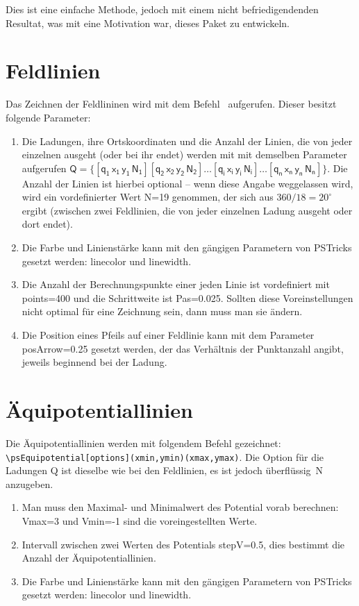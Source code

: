 \documentclass[11pt,english,ngerman,BCOR10mm,DIV12,bibliography=totoc,parskip=false,smallheadings
    headexclude,footexclude,oneside]{pst-doc}
\begin{document}
Dies ist eine einfache Methode, jedoch mit einem nicht befriedigendenden Resultat, was mit eine 
Motivation war, dieses Paket zu entwickeln.


\section{Feldlinien}
Das Zeichnen der Feldlininen wird mit dem Befehl \OptArgs\ aufgerufen.  
Dieser besitzt folgende Parameter:
\begin{enumerate}
  \item Die Ladungen, ihre Ortskoordinaten und die Anzahl der Linien, die von jeder einzelnen 
  ausgeht (oder bei ihr endet) werden mit mit demselben Parameter aufgerufen 
  $\mathsf{Q=\{[q_1\, x_1\, y_1\, N_1] [q_2\, x_2\, y_2\, N_2]\ldots[q_i\, x_i\, y_i\, N_i]
    \ldots [q_n\, x_n\, y_n\, N_n]\}}$. Die Anzahl der Linien ist hierbei optional -- wenn diese 
    Angabe weggelassen wird, wird ein vordefinierter Wert \textsf{N=19} genommen, der sich aus $360/18=20^\circ$ 
    ergibt (zwischen zwei Feldlinien, die von jeder einzelnen Ladung ausgeht oder dort endet).
  \item Die Farbe und Linienst\"{a}rke kann mit den g\"{a}ngigen Parametern von PSTricks 
  gesetzt werden: \textsf{linecolor} und \textsf{linewidth}.
  \item Die Anzahl der Berechnungspunkte einer jeden Linie ist vordefiniert mit \textsf{points=400} 
  und die Schrittweite ist \textsf{Pas=0.025}. Sollten diese Voreinstellungen nicht optimal f\"{u}r 
  eine Zeichnung sein, dann muss man sie \"{a}ndern.
  \item Die Position eines Pfeils auf einer Feldlinie kann mit dem Parameter \textsf{posArrow=0.25} 
  gesetzt werden, der das Verh\"{a}ltnis der Punktanzahl angibt, jeweils beginnend bei der Ladung.
\end{enumerate}
\section{\"{A}quipotentiallinien}
Die \"{A}quipotentiallinien werden mit folgendem Befehl gezeichnet: 
\verb+\psEquipotential[options](xmin,ymin)(xmax,ymax)+. Die Option f\"{u}r die Ladungen 
\textsf{Q} ist dieselbe wie bei den Feldlinien, es ist jedoch \"{u}berfl\"{u}ssig~\textsf{N} anzugeben.
\begin{enumerate}
  \item Man muss den Maximal- und Minimalwert des Potential vorab berechnen: \textsf{Vmax=3} und 
  \textsf{Vmin=-1} sind die voreingestellten Werte.
  \item Intervall zwischen zwei Werten des Potentials \textsf{stepV=0.5}, dies bestimmt die Anzahl der 
  \"{A}quipotentiallinien.
  \item Die Farbe und Linienst\"{a}rke kann mit den g\"{a}ngigen Parametern von PSTricks gesetzt werden: 
  \textsf{linecolor} und \textsf{linewidth}.
\end{enumerate}
\end{document}
